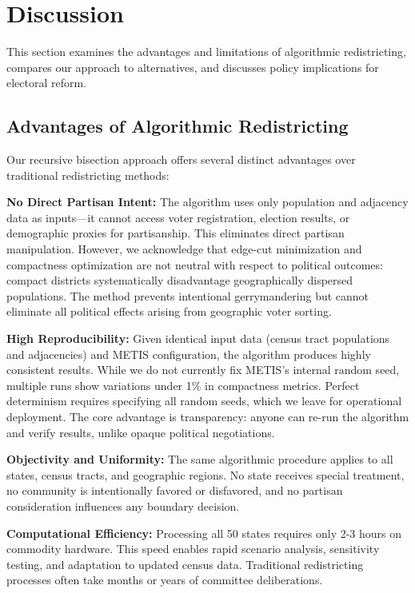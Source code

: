 \section{Discussion}
\label{sec:discussion}

This section examines the advantages and limitations of algorithmic redistricting, compares our approach to alternatives, and discusses policy implications for electoral reform.
\subsection{Advantages of Algorithmic Redistricting}

Our recursive bisection approach offers several distinct advantages over traditional redistricting methods:

\textbf{No Direct Partisan Intent:} The algorithm uses only population and adjacency data as inputs—it cannot access voter registration, election results, or demographic proxies for partisanship. This eliminates direct partisan manipulation. However, we acknowledge that edge-cut minimization and compactness optimization are not neutral with respect to political outcomes: compact districts systematically disadvantage geographically dispersed populations. The method prevents intentional gerrymandering but cannot eliminate all political effects arising from geographic voter sorting.

\textbf{High Reproducibility:} Given identical input data (census tract populations and adjacencies) and METIS configuration, the algorithm produces highly consistent results. While we do not currently fix METIS's internal random seed, multiple runs show variations under 1\% in compactness metrics. Perfect determinism requires specifying all random seeds, which we leave for operational deployment. The core advantage is transparency: anyone can re-run the algorithm and verify results, unlike opaque political negotiations.

\textbf{Objectivity and Uniformity:} The same algorithmic procedure applies to all states, census tracts, and geographic regions. No state receives special treatment, no community is intentionally favored or disfavored, and no partisan consideration influences any boundary decision.

\textbf{Computational Efficiency:} Processing all 50 states requires only 2-3 hours on commodity hardware. This speed enables rapid scenario analysis, sensitivity testing, and adaptation to updated census data. Traditional redistricting processes often take months or years of committee deliberations.

